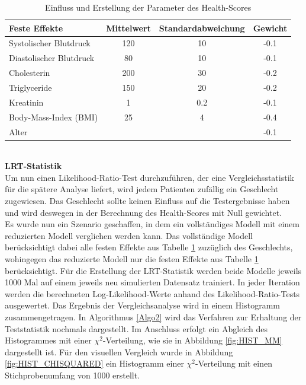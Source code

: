 \documentclass[%
thesis=student,%
coverpage=false,%
titlepage=false,%
headmarks=true, %
german,%
font=libertine, %
math=newpxtx, %
BCOR=5mm,%
coverBCOR=11mm%
]{tumbook}
\theoremstyle{break}
\begin{document}
\begin{table}[h]
	\centering
	\begin{tabular}{|l|c|c|c|}
		\hline
		\textbf{Feste Effekte} & \textbf{Mittelwert} & \textbf{Standardabweichung} & \textbf{Gewicht} \\
		\hline
		Systolischer Blutdruck  & 120 & 10 & -0.1\\ \hline
		Diastolischer Blutdruck & 80 & 10 & -0.1 \\ \hline
		Cholesterin  & 200 & 30 & -0.2 \\ \hline
		Triglyceride & 150 & 20 & -0.2  \\ \hline
		Kreatinin & 1 & 0.2 & -0.1 \\ \hline
		Body-Mass-Index (BMI) & 25 & 4 & -0.4 \\ \hline
		Alter & & & -0.1 \\ \hline
	\end{tabular}

	\caption{Einfluss und Erstellung der Parameter des Health-Scores}
	\label{tab:health_score_parameters}
\end{table}
\\
\textbf{LRT-Statistik}\\
Um nun einen Likelihood-Ratio-Test durchzuführen, der eine Vergleichsstatistik für die spätere Analyse liefert, wird jedem Patienten zufällig ein Geschlecht zugewiesen. Das Geschlecht sollte keinen Einfluss auf die Testergebnisse haben und wird deswegen in der Berechnung des Health-Scores mit Null gewichtet. \\
Es wurde nun ein Szenario geschaffen, in dem ein vollständiges Modell mit einem reduzierten Modell verglichen werden kann. Das vollständige Modell berücksichtigt dabei alle festen Effekte aus Tabelle \ref{tab:health_score_parameters} zuzüglich des Geschlechts, wohingegen das reduzierte Modell nur die festen Effekte aus Tabelle \ref{tab:health_score_parameters} berücksichtigt. Für die Erstellung der LRT-Statistik werden beide Modelle jeweils 1000 Mal auf einem jeweils neu simulierten Datensatz trainiert. In jeder Iteration werden die berechneten Log-Likelihood-Werte anhand des Likelihood-Ratio-Tests ausgewertet. Das Ergebnis der Vergleichsanalyse wird in einem Histogramm zusammengetragen. In Algorithmus \ref{Algo2} wird das Verfahren zur Erhaltung der Teststatistik nochmals dargestellt. Im Anschluss erfolgt ein Abgleich des Histogrammes mit einer $\chi^2$-Verteilung, wie sie in Abbildung \ref{fig:HIST_MM} dargestellt ist. Für den visuellen Vergleich wurde in Abbildung \ref{fig:HIST_CHISQUARED} ein Histogramm einer $\chi^2$-Verteilung mit einen Stichprobenumfang von 1000 erstellt.\\
\end{document}
